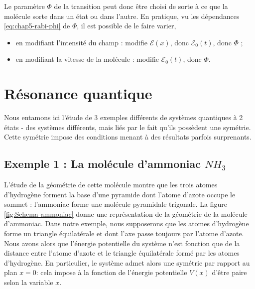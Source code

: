 \documentclass[../notesdecours.tex]{subfiles}
\begin{document}
Le paramètre $\Phi$ de la transition peut donc être choisi de sorte à ce que la molécule sorte dans un état ou dans l'autre. En pratique, vu les dépendances \eqref{eq:chap5-rabi-phi} de $\Phi$, il est possible de le faire varier, 
\begin{itemize}[label=$\blacktriangleright$]
    \item en modifiant l'intensité du champ : modifie $\mathcal{E}(x)$, donc $\mathcal{E}_0(t)$, donc $\Phi$ ;
    \item en modifiant la vitesse de la molécule : modifie $\mathcal{E}_0(t)$, donc $\Phi$.
\end{itemize}




\section{Résonance quantique}

Nous entamons ici l'étude de 3 exemples différents de systèmes quantiques à 2 états - des systèmes différents, mais liés par le fait qu'ils possèdent une symétrie. Cette symétrie impose des conditions menant à des résultats parfois surprenants.

\subsection*{Exemple 1 : La molécule d'ammoniac $NH_3$}

L'étude de la géométrie de cette molécule montre que les trois atomes d'hydrogène forment la base d'une pyramide dont l'atome d'azote occupe le sommet : l'ammoniac forme une molécule pyramidale trigonale. La figure \ref{fig:Schema ammoniac} donne une représentation de la géométrie de la molécule d'ammoniac. Dans notre exemple, nous supposerons que les atomes d'hydrogène forme un triangle équilatérale et dont l'axe passe toujours par l'atome d'azote. Nous avons alors que l'énergie potentielle du système n'est fonction que de la distance entre l'atome d'azote et le triangle équilatérale formé par les atomes d'hydrogène. En particulier, le système admet alors une symétrie par rapport au plan $x = 0$: cela impose à la fonction de l'énergie potentielle $V(x)$ d'être paire selon la variable $x$.\\
\end{document}
